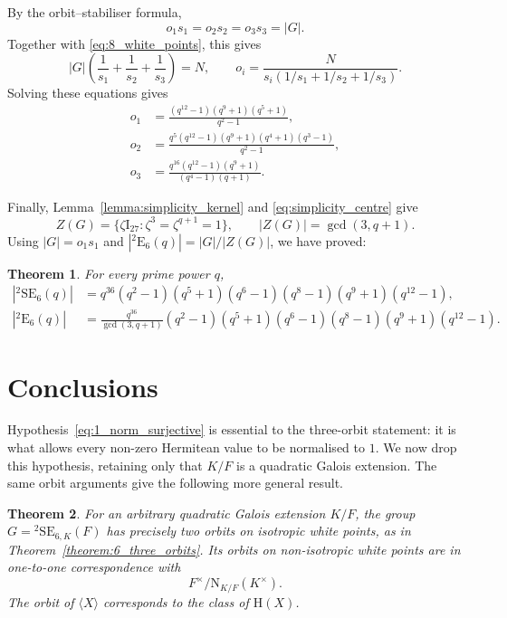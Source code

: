 \documentclass{amsart}
\def\NN{\mathord{\mathrm{N}}}
\def\II{\mathord{\mathrm{I}}}
\newcommand{\SE}{\mathrm{SE}}
\newcommand{\E}{\mathrm{E}}
\renewcommand{\H}{\mathrm{H}}
\theoremstyle{plain}
\newtheorem{theorem}{Theorem}
\numberwithin{theorem}{section}
\theoremstyle{definition}
\begin{document}
By the orbit--stabiliser formula,
\[
    o_1s_1=o_2s_2=o_3s_3=|G|.
\]
Together with \eqref{eq:8_white_points}, this gives
\begin{equation}
    \label{eq:8_order_from_orbits}
    |G|\left(\frac1{s_1}+\frac1{s_2}+\frac1{s_3}\right)=N,
    \qquad
    o_i=\frac{N}{s_i(1/s_1+1/s_2+1/s_3)}.
\end{equation}
Solving these equations gives
\begin{equation}
    \label{eq:8_orbit_lengths}
    \begin{aligned}
        o_1&=\frac{(q^{12}-1)(q^9+1)(q^5+1)}{q^2-1},\\
        o_2&=\frac{q^5(q^{12}-1)(q^9+1)(q^4+1)(q^3-1)}{q^2-1},\\
        o_3&=\frac{q^{16}(q^{12}-1)(q^9+1)}{(q^4-1)(q+1)}.
    \end{aligned}
\end{equation}

Finally, Lemma~\ref{lemma:simplicity_kernel} and
\eqref{eq:simplicity_centre} give
\[
    Z(G)=\{\zeta\II_{27}:\zeta^3=\zeta^{q+1}=1\},\qquad
    |Z(G)|=\gcd(3,q+1).
\]
Using $|G|=o_1s_1$ and $|{}^2\E_6(q)|=|G|/|Z(G)|$, we have proved:

\begin{theorem}
    \label{theorem:8_finite_orders}
    For every prime power $q$,
    \begin{align*}
        |{}^2\SE_6(q)|
            &=q^{36}(q^2-1)(q^5+1)(q^6-1)(q^8-1)(q^9+1)(q^{12}-1),\\
        |{}^2\E_6(q)|
            &=\frac{q^{36}}{\gcd(3,q+1)}
              (q^2-1)(q^5+1)(q^6-1)(q^8-1)(q^9+1)(q^{12}-1).
    \end{align*}
\end{theorem}

\section{Conclusions}
\label{section:conclusions}

Hypothesis~\eqref{eq:1_norm_surjective} is essential to the three-orbit
statement: it is what allows every non-zero Hermitean value to be
normalised to $1$. We now drop this hypothesis, retaining only that
$K/F$ is a quadratic Galois extension. The same orbit arguments give
the following more general result.

\begin{theorem}
    \label{theorem:conclusions_norm_orbits}
    For an arbitrary quadratic Galois extension $K/F$, the group
    $G={}^2\SE_{6,K}(F)$ has precisely two orbits on isotropic white
    points, as in Theorem~\ref{theorem:6_three_orbits}. Its orbits on
    non-isotropic white points are in one-to-one correspondence with
    \[
        F^\times/\NN_{K/F}(K^\times).
    \]
    The orbit of $\langle X\rangle$ corresponds to the class of $\H(X)$.
\end{theorem}
\end{document}
